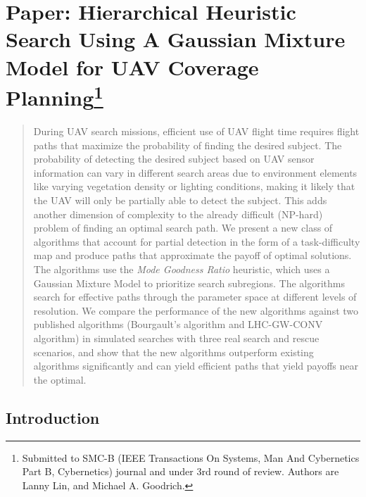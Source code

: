 \chapter[Paper: Hierarchical Heuristic Search Using A Gaussian Mixture Model for UAV Coverage Planning]{Paper: Hierarchical Heuristic Search Using A Gaussian Mixture Model for UAV Coverage Planning\footnote {Submitted to SMC-B (IEEE Transactions On Systems, Man And Cybernetics Part B, Cybernetics) journal and under 3rd round of review. Authors are Lanny Lin, and Michael A. Goodrich.}}
\label{chap:SMCB2014}

\begin{abstract}
During UAV search missions, efficient use of UAV flight time requires flight paths that maximize the probability of finding the desired subject. The probability of detecting the desired subject based on UAV sensor information can vary in different search areas due to environment elements like varying vegetation density or lighting conditions, making it likely that the UAV will only be partially able to detect the subject. This adds another dimension of complexity to the already difficult (NP-hard) problem of finding an optimal search path. We present a new class of algorithms that account for partial detection in the form of a task-difficulty map and produce paths that approximate the payoff of optimal solutions. The algorithms use the \textit{Mode Goodness Ratio} heuristic, which uses a Gaussian Mixture Model to prioritize search subregions. The algorithms search for effective paths through the parameter space at different levels of resolution. We compare the performance of the new algorithms against two published algorithms (Bourgault's algorithm and LHC-GW-CONV algorithm) in simulated searches with three real search and rescue scenarios, and show that the new algorithms outperform existing algorithms significantly and can yield efficient paths that yield payoffs near the optimal.  
\end{abstract}


%

\section{Introduction}
\label{sec:Introduction}

